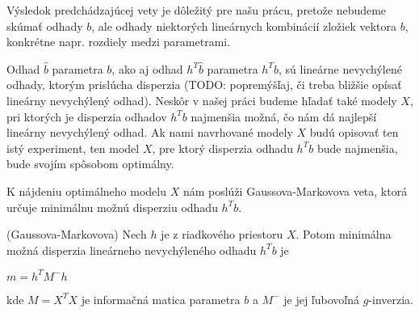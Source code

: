Výsledok predchádzajúcej vety je dôležitý pre našu prácu, pretože nebudeme skúmať odhady $b$,
ale odhady niektorých lineárnych kombinácií zložiek vektora $b$, 
konkrétne napr. rozdiely medzi parametrami.

Odhad $\hat{b}$ parametra $b$, ako aj odhad $h^T \hat{b}$ parametra $h^T b$, sú lineárne nevychýlené odhady,
ktorým prislúcha disperzia (TODO: popremýšľaj, či treba bližšie opísať lineárny nevychýlený odhad). 
Neskôr v našej práci budeme hľadať také modely $X$, pri ktorých je disperzia odhadov $h^T b$ najmenšia možná,
čo nám dá najlepší lineárny nevychýlený odhad. 
Ak nami navrhované modely $X$ budú opisovať ten istý experiment, ten model $X$,
pre ktorý disperzia odhadu $h^T b$ bude najmenšia, bude svojím spôsobom optimálny.

K nájdeniu optimálneho modelu $X$ nám poslúži Gaussova-Markovova veta, 
ktorá určuje minimálnu možnú disperziu odhadu $h^T b$.

\begin{theorem}
\label{gauss-markov}
(Gaussova-Markovova) Nech $h$ je z riadkového priestoru $X$. 
Potom minimálna možná disperzia lineárneho nevychýleného odhadu $h^T b$ je

\begin{center}
$
m = h^T M^- h
$
\end{center}

kde $M = X^T X$ je informačná matica parametra $b$ a $M^-$ je jej ľubovoľná $g$-inverzia.
\end{theorem}